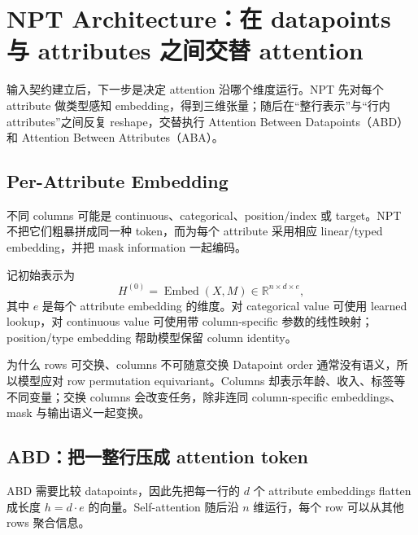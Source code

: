 \section{NPT Architecture：在 datapoints 与 attributes 之间交替 attention}

输入契约建立后，下一步是决定 attention 沿哪个维度运行。NPT 先对每个 attribute 做类型感知 embedding，得到三维张量；随后在“整行表示”与“行内 attributes”之间反复 reshape，交替执行 Attention Between Datapoints（ABD）和 Attention Between Attributes（ABA）。

\subsection{Per-Attribute Embedding}

不同 columns 可能是 continuous、categorical、position/index 或 target。NPT 不把它们粗暴拼成同一种 token，而为每个 attribute 采用相应 linear/typed embedding，并把 mask information 一起编码。


记初始表示为
\[
H^{(0)}=\operatorname{Embed}(X,M)
\in\mathbb{R}^{n\times d\times e},
\]
其中 $e$ 是每个 attribute embedding 的维度。对 categorical value 可使用 learned lookup，对 continuous value 可使用带 column-specific 参数的线性映射；position/type embedding 帮助模型保留 column identity。

\begin{knowledgebox}{为什么 rows 可交换、columns 不可随意交换}
Datapoint order 通常没有语义，所以模型应对 row permutation equivariant。Columns 却表示年龄、收入、标签等不同变量；交换 columns 会改变任务，除非连同 column-specific embeddings、mask 与输出语义一起变换。
\end{knowledgebox}

\subsection{ABD：把一整行压成 attention token}

ABD 需要比较 datapoints，因此先把每一行的 $d$ 个 attribute embeddings flatten 成长度 $h=d\cdot e$ 的向量。Self-attention 随后沿 $n$ 维运行，每个 row 可以从其他 rows 聚合信息。


